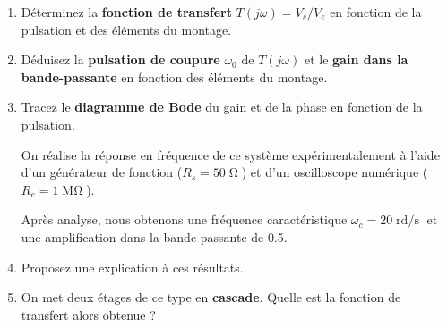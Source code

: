 \begin{enumerate}
	\item Déterminez la \textbf{fonction de transfert} $T( j\omega ) = V_s / V_e$ en fonction de la pulsation et des éléments du montage.
		
	\item Déduisez la \textbf{pulsation de coupure} $\omega_0$ de $T( j\omega )$ et le \textbf{gain dans la bande-passante} en fonction des éléments du montage.

	\item Tracez le \textbf{diagramme de Bode} du gain et de la phase en fonction de la pulsation.

	\medskip
	
	On réalise la réponse en fréquence de ce système expérimentalement à l'aide d'un générateur de fonction ($R_s = 50\operatorname{\Omega}$) et d'un oscilloscope numérique ($R_e = 1\operatorname{M\Omega}$).
	
	Après analyse, nous obtenons une fréquence caractéristique $\omega_c = 20\operatorname{rd/s}$ et une amplification dans la bande passante de 0.5.
	
	\item Proposez une explication à ces résultats.
	
	\medskip
	
	\item On met deux étages de ce type en \textbf{cascade}. Quelle est la fonction de transfert alors obtenue ?

\end{enumerate}


